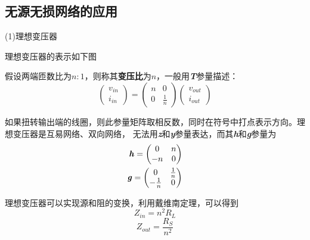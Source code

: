     \subsection{无源无损网络的应用}
    \par (1)理想变压器
    \par 理想变压器的表示如下图
    \begin{center}
    \end{center}
    \par 假设两端匝数比为$n:1$，则称其\textbf{变压比}为$n$，一般用\textbf{\textit{T}}参量描述：
    \[
    \begin{pmatrix}
        v_{in} \\ i_{in}
    \end{pmatrix}=
    \begin{pmatrix}
        n & 0 \\ 0 & \frac{1}{n}
    \end{pmatrix}
    \begin{pmatrix}
        v_{out} \\ i_{out}
    \end{pmatrix}   
    \]
    \par 如果扭转输出端的线圈，则此参量矩阵取相反数，同时在符号中打点表示方向。理想变压器是互易网络、双向网络，
    无法用\textbf{\textit{z}}和\textbf{\textit{y}}参量表达，而其\textbf{\textit{h}}和\textbf{\textit{g}}参量为
    \begin{align*}
        \textbf{\textit{h}}=
        \begin{pmatrix}
            0 & n \\ -n & 0
        \end{pmatrix} \\
        \textbf{\textit{g}}=
        \begin{pmatrix}
            0 & \frac{1}{n} \\ -\frac{1}{n} & 0
        \end{pmatrix}
    \end{align*}
    \par 理想变压器可以实现源和阻的变换，利用戴维南定理，可以得到
    \[
    Z_{in}=n^2R_L    
    \]
    \[
    Z_{out}=\frac{R_S}{n^2}    
    \]
